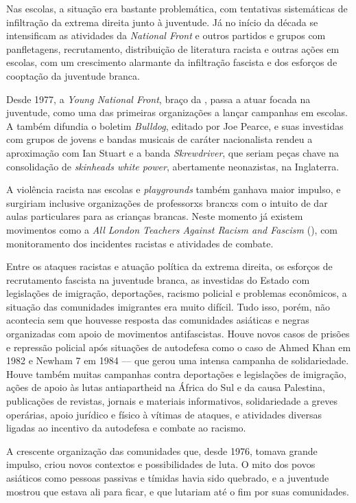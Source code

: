 Nas escolas, a situação era bastante problemática, com tentativas sistemáticas de infiltração da extrema direita junto à juventude. Já no início da década se intensificam as atividades da \emph{National Front} e outros partidos e grupos com panfletagens, recrutamento, distribuição de literatura racista e outras ações em escolas, com um crescimento alarmante da infiltração fascista e dos esforços de cooptação da juventude branca.

Desde 1977, a \emph{Young National Front}, braço da , passa a atuar focada na juventude, como uma das primeiras organizações a lançar campanhas em escolas. A  também difundia o boletim \emph{Bulldog}, editado por Joe Pearce, e suas investidas com grupos de jovens e bandas musicais de caráter nacionalista rendeu a aproximação com Ian Stuart e a banda \emph{Skrewdriver}, que seriam peças chave na consolidação de \emph{skinheads white power}, abertamente neonazistas, na Inglaterra.

A violência racista nas escolas e \emph{playgrounds} também ganhava maior impulso, e surgiriam inclusive organizações de professorxs brancxs com o intuito de dar aulas particulares para as crianças brancas. Neste momento já existem movimentos como a \emph{All London Teachers Against Racism and Fascism} (), com monitoramento dos incidentes racistas e atividades de combate.

Entre os ataques racistas e atuação política da extrema direita, os esforços de recrutamento fascista na juventude branca, as investidas do Estado com legislações de imigração, deportações, racismo policial e problemas econômicos, a situação das comunidades imigrantes era muito difícil. Tudo isso, porém, não acontecia sem que houvesse resposta das comunidades asiáticas e negras organizadas com apoio de movimentos antifascistas. Houve novos casos de prisões e repressão policial após situações de autodefesa como o caso de Ahmed Khan em 1982 e Newham 7 em 1984 --- que gerou uma intensa campanha de solidariedade. Houve também muitas campanhas contra deportações e legislações de imigração, ações de apoio às lutas antiapartheid na África do Sul e da causa Palestina, publicações de revistas, jornais e materiais informativos, solidariedade a greves operárias, apoio jurídico e físico à vítimas de ataques, e atividades diversas ligadas ao incentivo da autodefesa e combate ao racismo.

 


A crescente organização das comunidades que, desde 1976, tomava grande impulso, criou novos contextos e possibilidades de luta. O mito dos povos asiáticos como pessoas passivas e tímidas havia sido quebrado, e a juventude mostrou que estava ali para ficar, e que lutariam até o fim por suas comunidades.

